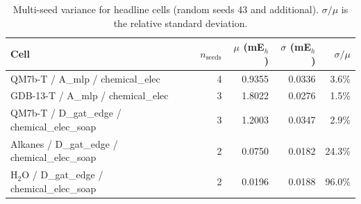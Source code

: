 \begin{table}[t]
\centering
\caption{Multi-seed variance for headline cells (random seeds 43 and additional). $\sigma/\mu$ is the relative standard deviation.}
\label{tab:variance}
\begin{tabular}{lrrrr}
\toprule
Cell & $n_\text{seeds}$ & $\mu$ (mE$_h$) & $\sigma$ (mE$_h$) & $\sigma/\mu$ \\
\midrule
QM7b-T / A\_mlp / chemical\_elec & 4 & 0.9355 & 0.0336 & 3.6\% \\
GDB-13-T / A\_mlp / chemical\_elec & 3 & 1.8022 & 0.0276 & 1.5\% \\
QM7b-T / D\_gat\_edge / chemical\_elec\_soap & 3 & 1.2003 & 0.0347 & 2.9\% \\
Alkanes / D\_gat\_edge / chemical\_elec\_soap & 2 & 0.0750 & 0.0182 & 24.3\% \\
H$_2$O / D\_gat\_edge / chemical\_elec\_soap & 2 & 0.0196 & 0.0188 & 96.0\% \\
\bottomrule
\end{tabular}
\end{table}

